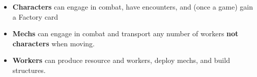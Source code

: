 \documentclass[12pt]{article}
\newenvironment{itemizeCustom}
{\begin{itemize}
  \setlength{\itemsep}{1pt}
  \setlength{\parskip}{0pt}
  \setlength{\parsep}{0pt}}
{\end{itemize}}
\begin{document}
\begin{multicols*}{2}
\begin{itemizeCustom}
    \item\textbf{Characters} can engage in combat, have encounters, and (once a game) gain a Factory card
    \item \textbf{Mechs} can engage in combat and transport any number of workers {\textbf{not characters}} when moving.
    \item \textbf{Workers} can produce resource and workers, deploy mechs, and build structures.
\end{itemizeCustom}

\end{multicols*}
\end{document}
